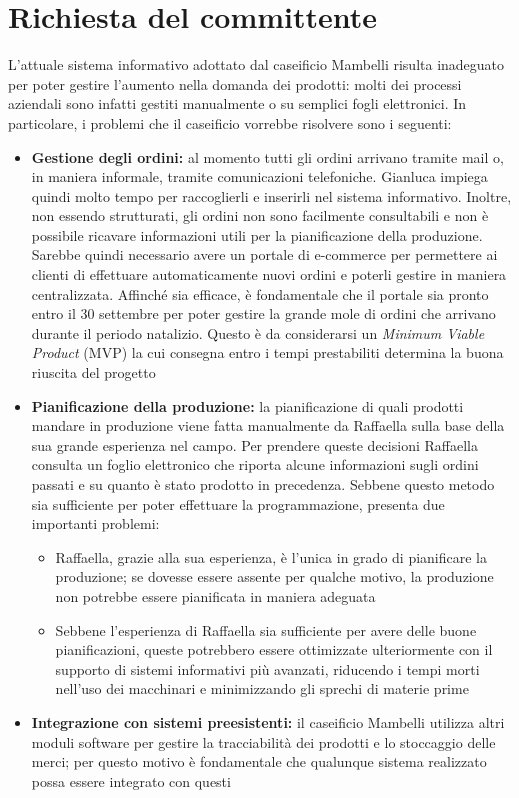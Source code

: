 \section{Richiesta del committente}\label{sec:richiesta-del-committente}
L'attuale sistema informativo adottato dal caseificio Mambelli risulta inadeguato per poter gestire l'aumento nella domanda dei prodotti: molti dei processi aziendali sono infatti gestiti manualmente o su semplici fogli elettronici. In particolare, i problemi che il caseificio vorrebbe risolvere sono i seguenti:
\begin{itemize}
  \item \textbf{Gestione degli ordini:} al momento tutti gli ordini arrivano tramite mail o, in maniera informale, tramite comunicazioni telefoniche. Gianluca impiega quindi molto tempo per raccoglierli e inserirli nel sistema informativo. Inoltre, non essendo strutturati, gli ordini non sono facilmente consultabili e non è possibile ricavare informazioni utili per la pianificazione della produzione. Sarebbe quindi necessario avere un portale di e-commerce per permettere ai clienti di effettuare automaticamente nuovi ordini e poterli gestire in maniera centralizzata. Affinché sia efficace, è fondamentale che il portale sia pronto entro il 30 settembre per poter gestire la grande mole di ordini che arrivano durante il periodo natalizio. Questo è da considerarsi un \emph{Minimum Viable Product} (MVP) la cui consegna entro i tempi prestabiliti determina la buona riuscita del progetto
  \item \textbf{Pianificazione della produzione:} la pianificazione di quali prodotti mandare in produzione viene fatta manualmente da Raffaella sulla base della sua grande esperienza nel campo. Per prendere queste decisioni Raffaella consulta un foglio elettronico che riporta alcune informazioni sugli ordini passati e su quanto è stato prodotto in precedenza. Sebbene questo metodo sia sufficiente per poter effettuare la programmazione, presenta due importanti problemi:
        \begin{itemize}
          \item Raffaella, grazie alla sua esperienza, è l'unica in grado di pianificare la produzione; se dovesse essere assente per qualche motivo, la produzione non potrebbe essere pianificata in maniera adeguata
          \item Sebbene l'esperienza di Raffaella sia sufficiente per avere delle buone pianificazioni, queste potrebbero essere ottimizzate ulteriormente con il supporto di sistemi informativi più avanzati, riducendo i tempi morti nell'uso dei macchinari e minimizzando gli sprechi di materie prime
        \end{itemize}
  \item \textbf{Integrazione con sistemi preesistenti:} il caseificio Mambelli utilizza altri moduli software per gestire la tracciabilità dei prodotti e lo stoccaggio delle merci; per questo motivo è fondamentale che qualunque sistema realizzato possa essere integrato con questi
\end{itemize}

